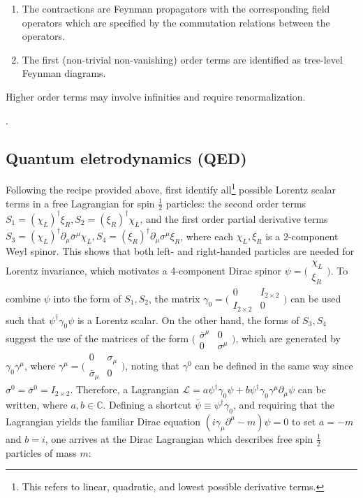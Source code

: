 {\begin{enumerate}
        \item The contractions are Feynman propagators with the
            corresponding field operators which are specified by the commutation
            relations between the operators.

        \item The first (non-trivial non-vanishing) order terms are identified
            as tree-level Feynman diagrams.
    \end{enumerate}
    Higher order terms may involve infinities and require renormalization.
}.


\subsection{Quantum eletrodynamics (QED)}
\label{qed}

Following the recipe provided above, first identify all\footnote{
    This refers to linear, quadratic, and lowest possible derivative terms.
} possible Lorentz scalar
terms in a free Lagrangian for spin $\frac{1}{2}$ particles:
the second order terms
$S_1 = (\chi_L)^\dagger \xi_R, S_2 = (\xi_R)^\dagger\chi_L$,
and the first order partial derivative terms
$S_3 = (\chi_L)^\dagger \partial_\mu \bar{\sigma}^\mu \chi_L,
S_4 = (\xi_R)^\dagger \partial_\mu {\sigma}^\mu \xi_R$,
where each $\chi_L, \xi_R$ is a 2-component Weyl spinor.
This shows that both left- and right-handed particles are needed for Lorentz
invariance,
which motivates a 4-component Dirac spinor
$\psi = \bigl(\begin{smallmatrix} \chi_L \\ \xi_R \end{smallmatrix}\bigr)$.
To combine $\psi$ into the form of $S_1, S_2$,
the matrix
$\gamma_0 = \bigl(\begin{smallmatrix} 0 & I_{2 \times 2} \\ I_{2 \times 2} & 0 \end{smallmatrix}\bigr)$
can be used such that $\psi^\dagger \gamma_0 \psi$ is a Lorentz scalar.
On the other hand,
the forms of $S_3, S_4$ suggest the use of the matrices of the form
$\bigl(\begin{smallmatrix} \bar{\sigma}^\mu & 0 \\ 0 & \sigma^\mu \end{smallmatrix}\bigr)$,
which are generated by $\gamma_0 \gamma^\mu$,
where $\gamma^\mu = \bigl(\begin{smallmatrix} 0 & {\sigma}_\mu \\ \bar{\sigma}_\mu & 0 \end{smallmatrix}\bigr)$,
noting that $\gamma^0$ can be defined in the same way since
$\sigma^0 = \bar{\sigma}^0 = I_{2 \times 2}$.
Therefore, a Lagrangian
$\mathcal{L} = a \psi^\dagger \gamma_0 \psi + b \psi^\dagger \gamma_0 \gamma^\mu \partial_\mu \psi$
can be written, where $a, b \in \mathbb{C}$.
Defining a shortcut $\bar{\psi} \equiv \psi^\dagger \gamma_0$,
and requiring that the Lagrangian yields the familiar Dirac equation
$(i \gamma_\mu \partial^\mu - m)\psi = 0$ to set $a = -m$ and $ b = i$,
one arrives at the Dirac Lagrangian which describes free spin $\frac{1}{2}$
particles of mass $m$:

